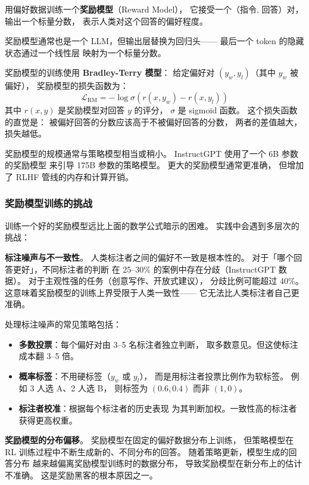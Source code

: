 用偏好数据训练一个\textbf{奖励模型}（Reward Model），
它接受一个（指令, 回答）对，输出一个标量分数，
表示人类对这个回答的偏好程度。

奖励模型通常也是一个 LLM，但输出层替换为回归头——
最后一个 token 的隐藏状态通过一个线性层
映射为一个标量分数。

奖励模型的训练使用 \textbf{Bradley-Terry 模型}：
给定偏好对 $(y_w, y_l)$（其中 $y_w$ 被偏好），
奖励模型的损失函数为：
\begin{equation}
  \mathcal{L}_{\text{RM}} = -\log \sigma(r(x, y_w) - r(x, y_l))
  \label{eq:reward-model}
\end{equation}
其中 $r(x, y)$ 是奖励模型对回答 $y$ 的评分，
$\sigma$ 是 sigmoid 函数。
这个损失函数的直觉是：
被偏好回答的分数应该高于不被偏好回答的分数，
两者的差值越大，损失越低。

奖励模型的规模通常与策略模型相当或稍小。
InstructGPT 使用了一个 6B 参数的奖励模型
来引导 175B 参数的策略模型。
更大的奖励模型通常更准确，
但增加了 RLHF 管线的内存和计算开销。

\subsubsection{奖励模型训练的挑战}

训练一个好的奖励模型远比上面的数学公式暗示的困难。
实践中会遇到多层次的挑战：

\textbf{标注噪声与不一致性}。
人类标注者之间的偏好不一致是根本性的。
对于「哪个回答更好」，不同标注者的判断
在 25--30\% 的案例中存在分歧（InstructGPT 数据）。
对于主观性强的任务（创意写作、开放式建议），
分歧比例可能超过 40\%。
这意味着奖励模型的训练上界受限于人类一致性——
它无法比人类标注者自己更准确。

处理标注噪声的常见策略包括：
\begin{itemize}[noitemsep]
  \item \textbf{多数投票}：每个偏好对由 3--5 名标注者独立判断，
        取多数意见。但这使标注成本翻 3--5 倍。
  \item \textbf{概率标签}：不用硬标签（$y_w$ 或 $y_l$），
        而是用标注者投票比例作为软标签。
        例如 3 人选 A、2 人选 B，
        则标签为 $(0.6, 0.4)$ 而非 $(1, 0)$。
  \item \textbf{标注者校准}：根据每个标注者的历史表现
        为其判断加权。一致性高的标注者获得更高权重。
\end{itemize}

\textbf{奖励模型的分布偏移}。
奖励模型在固定的偏好数据分布上训练，
但策略模型在 RL 训练过程中不断生成新的、不同分布的回答。
随着策略更新，模型生成的回答分布
越来越偏离奖励模型训练时的数据分布，
导致奖励模型在新分布上的估计不准确。
这是奖励黑客的根本原因之一。

